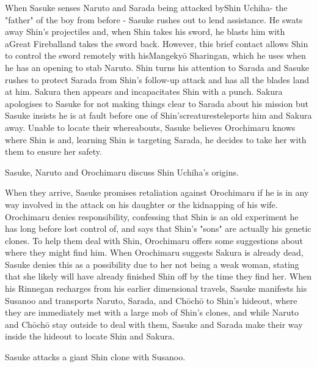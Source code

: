\documentclass[a4paper,12pt]{article}
\begin{document}
When Sasuke senses Naruto and Sarada being attacked byShin Uchiha- the "father" of the boy from before - Sasuke rushes out to lend assistance. He swats away Shin's projectiles and, when Shin takes his sword, he blasts him with aGreat Fireballand takes the sword back. However, this brief contact allows Shin to control the sword remotely with hisMangekyō Sharingan, which he uses when he has an opening to stab Naruto. Shin turns his attention to Sarada and Sasuke rushes to protect Sarada from Shin's follow-up attack and has all the blades land at him. Sakura then appears and incapacitates Shin with a punch. Sakura apologises to Sasuke for not making things clear to Sarada about his mission but Sasuke insists he is at fault before one of Shin'screaturesteleports him and Sakura away. Unable to locate their whereabouts, Sasuke believes Orochimaru knows where Shin is and, learning Shin is targeting Sarada, he decides to take her with them to ensure her safety.\\ \par \vspace{0.5cm}

Sasuke, Naruto and Orochimaru discuss Shin Uchiha's origins.\\ \par \vspace{0.5cm}

When they arrive, Sasuke promises retaliation against Orochimaru if he is in any way involved in the attack on his daughter or the kidnapping of his wife. Orochimaru denies responsibility, confessing that Shin is an old experiment he has long before lost control of, and says that Shin's "sons" are actually his genetic clones. To help them deal with Shin, Orochimaru offers some suggestions about where they might find him. When Orochimaru suggests Sakura is already dead, Sasuke denies this as a possibility due to her not being a weak woman, stating that she likely will have already finished Shin off by the time they find her. When his Rinnegan recharges from his earlier dimensional travels, Sasuke manifests his Susanoo and transports Naruto, Sarada, and Chōchō to Shin's hideout, where they are immediately met with a large mob of Shin's clones, and while Naruto and Chōchō stay outside to deal with them, Sasuke and Sarada make their way inside the hideout to locate Shin and Sakura.\\ \par \vspace{0.5cm}

Sasuke attacks a giant Shin clone with Susanoo.\\ \par \vspace{0.5cm}
\end{document}
